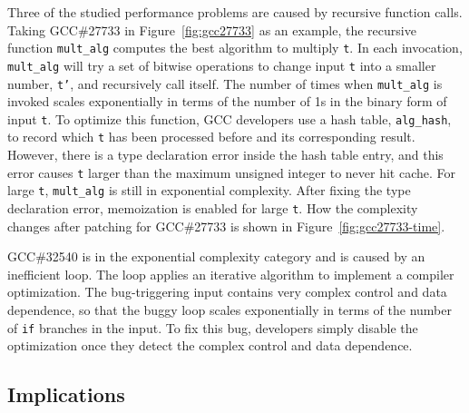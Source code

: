 Three of the studied performance problems are caused by recursive function calls. 
Taking GCC\#27733 in Figure~\ref{fig:gcc27733} as an example, 
the recursive function \texttt{mult\_alg} computes the best algorithm to multiply \texttt{t}.
In each invocation, \texttt{mult\_alg} will try a set of bitwise 
operations to change input 
\texttt{t} into a smaller number, \texttt{t'}, 
and recursively call itself.
The number of times when \texttt{mult\_alg} is invoked scales exponentially 
in terms of the number of 1s in the binary form of input \texttt{t}.
To optimize this function, 
GCC developers use a hash table, \texttt{alg\_hash}, to record
which \texttt{t} has been processed before and its corresponding result.
However, there is a type declaration error inside the hash table entry,
and this error causes \texttt{t} larger than the maximum unsigned integer to never hit cache.
For large \texttt{t}, \texttt{mult\_alg} is still in exponential complexity. 
After fixing the type declaration error, 
memoization is enabled for large \texttt{t}. 
How the complexity changes after patching for GCC\#27733 is shown in Figure~\ref{fig:gcc27733-time}.

GCC\#32540 is in the exponential complexity category and is caused by an inefficient loop. 
The loop applies an iterative algorithm to implement a compiler optimization. 
The bug-triggering input contains very complex control and data dependence,  
so that the buggy loop scales exponentially in terms of the number 
of \texttt{if} branches in the input. 
To fix this bug, developers simply disable the optimization 
once they detect the complex control and data dependence.  


\subsection{Implications}
\label{sec:study_impli}

